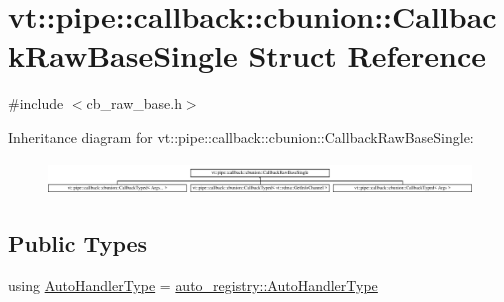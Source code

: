 \hypertarget{structvt_1_1pipe_1_1callback_1_1cbunion_1_1_callback_raw_base_single}{}\section{vt\+:\+:pipe\+:\+:callback\+:\+:cbunion\+:\+:Callback\+Raw\+Base\+Single Struct Reference}
\label{structvt_1_1pipe_1_1callback_1_1cbunion_1_1_callback_raw_base_single}


{\ttfamily \#include $<$cb\+\_\+raw\+\_\+base.\+h$>$}

Inheritance diagram for vt\+:\+:pipe\+:\+:callback\+:\+:cbunion\+:\+:Callback\+Raw\+Base\+Single\+:\begin{figure}[H]
\begin{center}
\leavevmode
\includegraphics[height=0.899598cm]{structvt_1_1pipe_1_1callback_1_1cbunion_1_1_callback_raw_base_single}
\end{center}
\end{figure}
\subsection*{Public Types}
\begin{DoxyCompactItemize}
\item 
using \hyperlink{structvt_1_1pipe_1_1callback_1_1cbunion_1_1_callback_raw_base_single_a734a9c83099de5bc1cd85f9da8dba7bb}{Auto\+Handler\+Type} = \hyperlink{namespacevt_1_1auto__registry_ae295e18699146815bb7d7674594d95d7}{auto\+\_\+registry\+::\+Auto\+Handler\+Type}
\end{DoxyCompactItemize}
